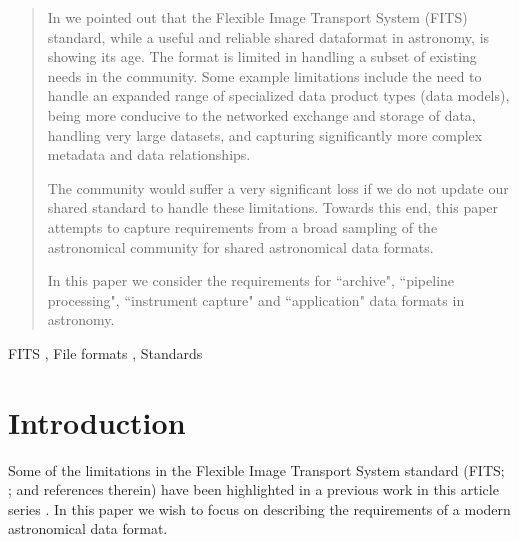 \documentclass[final,authoryear,5p,times,twocolumn]{elsarticle}
\begin{document}
\begin{frontmatter}
\begin{abstract}

In  we pointed out that
the Flexible Image Transport System (FITS) standard, while a useful and
reliable shared dataformat in astronomy, is showing its age.
The format is limited in handling a subset of existing needs in the community.
Some example limitations include the need to handle an expanded range of 
specialized data product types (data models), being more conducive to the 
networked exchange and storage of data, handling very large datasets, and capturing
significantly more complex metadata and data relationships.

The community would suffer a very significant loss if we do not update our shared
standard to handle these limitations. Towards this end, this paper attempts to
capture requirements from a broad sampling of the astronomical community for 
shared astronomical data formats. 

In this paper we consider the requirements for ``archive", ``pipeline
processing", ``instrument capture"
and ``application" data formats in astronomy.

\end{abstract}

\begin{keyword}%


FITS \sep
File formats \sep
Standards
\end{keyword}

\end{frontmatter}


\newcommand{\aspconf}{ASP Conf.\ Ser}
\newcommand{\aap}{A\&A}
\newcommand{\aaps}{A\&AS}
\newcommand{\jrasc}{JRASC}
\newcommand{\qjras}{QJRAS}
\newcommand{\mnras}{MNRAS}
\newcommand{\pasp}{PASP}
\newcommand{\pasa}{PASA}
\newcommand{\apjs}{ApJS}

\section{Introduction}

Some of the limitations in the Flexible Image Transport System standard (FITS;
\citealt{1981A&AS...44..363W,1981A&AS...44..371G,2001A&A...376..359H,2010A&A...524A..42P}; and references therein)
have been highlighted in a previous work in this article series
\citep[][hereafter referred to as ]{2014Thommas}.
In this paper we wish to focus on describing the requirements of a modern
astronomical data format.
\end{document}
